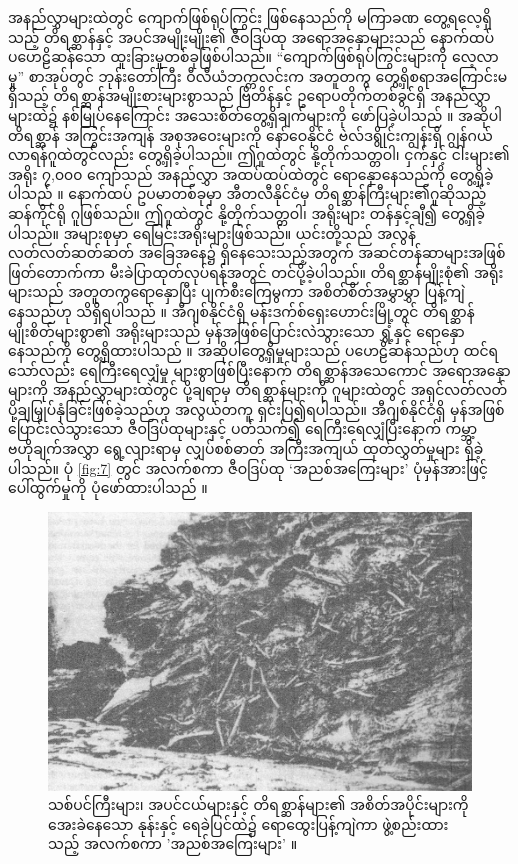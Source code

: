 \documentclass[10pt,twocolumn,letterpaper]{article}
\begin{document}
အနည်လွှာများထဲတွင် ကျောက်ဖြစ်ရုပ်ကြွင်း ဖြစ်နေသည်ကို မကြာခဏ တွေ့ရလေ့ရှိသည့် တိရစ္ဆာန်နှင့် အပင်အမျိုးမျိုး၏ ဇီဝဒြပ်ထု အရောအနှောများသည် နောက်ထပ်ပ‌ဟေဠိဆန်သော ထူးခြားမှုတစ်ခုဖြစ်ပါသည်။ “ကျောက်ဖြစ်ရုပ်ကြွင်းများကို လေ့လာမှု” စာအုပ်တွင် ဘုန်းတော်ကြီး ဝီလီယံဘက္ကလင်းက အတူတကွ တွေ့ရှိစရာအကြောင်းမရှိသည့် တိရစ္ဆာန်အမျိုးစားများစွာသည် ဗြိတိန်နှင့် ဥရောပတိုက်တစ်ခွင်ရှိ အနည်လွှာများထဲ၌ နစ်မြုပ်နေကြောင်း အသေးစိတ်တွေ့ရှိချက်များကို ဖော်ပြခဲ့ပါသည် \cite{58}။ အဆိုပါ တိရစ္ဆာန် အကြွင်းအကျန် အစုအဝေးများကို နော်ဝေနိုင်ငံ ဗဲလ်ဒရွိုင်းကျွန်းရှိ ဂျွန်ဂယ်လာရန်ဂူထဲတွင်လည်း တွေ့ရှိခဲ့ပါသည်။ ဤဂူထဲတွင် နို့တိုက်သတ္တဝါ၊ ငှက်နှင့် ငါးများ၏ အရိုး ၇,၀၀၀ ကျော်သည် အနည်လွှာ အထပ်ထပ်ထဲတွင် ရောနှောနေသည်ကို တွေ့ရှိခဲ့ပါသည် \cite{59}။ နောက်ထပ် ဥပမာတစ်ခုမှာ အီတလီနိုင်ငံမှ တိရစ္ဆာန်ကြီးများ၏ဂူဆိုသည့် ဆန်ကိုင်ရို ဂူဖြစ်သည်။ ဤဂူထဲတွင် နို့တိုက်သတ္တဝါ၊ အရိုးများ တန်နှင့်ချီ၍ တွေ့ရှိခဲ့ပါသည်။ အများစုမှာ ရေမြင်းအရိုးများဖြစ်သည်။ ယင်းတို့သည် အလွန်လတ်လတ်ဆတ်ဆတ် အခြေအနေ၌ ရှိနေသေးသည့်အတွက် အဆင်တန်ဆာများအဖြစ် ဖြတ်တောက်ကာ မီးခဲပြာထုတ်လုပ်ရန်အတွင် တင်ပို့ခဲ့ပါသည်။ တိရစ္ဆာန်မျိုးစုံ၏ အရိုးများသည် အတူတကွရောနှောပြီး ပျက်စီးကြေမွကာ အစိတ်စိတ်အမွှာမွှာ ပြန့်ကျဲနေသည်ဟု သိရှိရပါသည် \cite{60,61}။ အီဂျစ်နိုင်ငံရှိ မန်းဒက်စ်ရှေးဟောင်းမြို့တွင် တိရစ္ဆာန်မျိုးစိတ်များစွာ၏ အရိုးများသည် မှန်အဖြစ်ပြောင်းလဲသွားသော ရွှံ့နှင့် ရောနှောနေသည်ကို တွေ့ရှိထားပါသည် \cite{57}။ အဆိုပါတွေ့ရှိမှုများသည် ပဟေဠိဆန်သည်ဟု ထင်ရသော်လည်း ရေကြီးရေလျှံမှု များစွာဖြစ်ပြီးနောက် တိရစ္ဆာန်အသေကောင် အရောအနှောများကို အနည်လွှာများထဲတွင် ပို့ချရာမှ တိရစ္ဆာန်များကို ဂူများထဲတွင် အရှင်လတ်လတ် ပို့ချမြှုပ်နှံခြင်းဖြစ်ခဲ့သည်ဟု အလွယ်တကူ ရှင်းပြ၍ရပါသည်။ အီဂျစ်နိုင်ငံရှိ မှန်အဖြစ်ပြောင်းလဲသွားသော ဇီဝဒြပ်ထုများနှင့် ပတ်သက်၍ ရေကြီးရေလျှံပြီးနောက် ကမ္ဘာ့ဗဟိုချက်အလွှာ ရွေ့လျားရာမှ လျှပ်စစ်ဓာတ် အကြီးအကျယ် ထုတ်လွှတ်မှုများ ရှိခဲ့ပါသည်။ ပုံ \ref{fig:7} တွင် အလက်စကာ ဇီဝဒြပ်ထု ‘အညစ်အကြေးများ' ပုံမှန်အားဖြင့် ပေါ်ထွက်မှုကို ပုံဖော်ထားပါသည် \cite{56}။

\begin{figure}[t]
\begin{center}
   \includegraphics[width=1\linewidth]{muck-crop.jpeg}
\end{center}
   \caption{သစ်ပင်ကြီးများ၊ အပင်ငယ်များနှင့် တိရစ္ဆာန်များ၏ အစိတ်အပိုင်းများကို အေးခဲနေသော နုန်းနှင့် ရေခဲပြင်ထဲ၌ ရောထွေးပြန့်ကျဲကာ ဖွဲ့စည်းထားသည့် အလက်စကာ 'အညစ်အကြေးများ’ \cite{146}။}
\label{fig:7}
\label{fig:onecol}
\end{figure}
\end{document}
